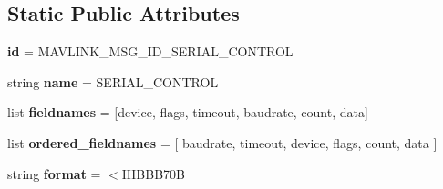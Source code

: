 \subsection*{Static Public Attributes}
\begin{DoxyCompactItemize}
\item 
\mbox{\label{classpymavlink_1_1dialects_1_1v10_1_1MAVLink__serial__control__message_aa2408844aac2a3b64120b519a9031504}} 
{\bfseries id} = M\+A\+V\+L\+I\+N\+K\+\_\+\+M\+S\+G\+\_\+\+I\+D\+\_\+\+S\+E\+R\+I\+A\+L\+\_\+\+C\+O\+N\+T\+R\+OL
\item 
\mbox{\label{classpymavlink_1_1dialects_1_1v10_1_1MAVLink__serial__control__message_ae221a8be8c837e2b15048c8d3442da6c}} 
string {\bfseries name} = \textquotesingle{}S\+E\+R\+I\+A\+L\+\_\+\+C\+O\+N\+T\+R\+OL\textquotesingle{}
\item 
\mbox{\label{classpymavlink_1_1dialects_1_1v10_1_1MAVLink__serial__control__message_a2f12e1de082185361d64c11f4c0a5c3f}} 
list {\bfseries fieldnames} = \mbox{[}\textquotesingle{}device\textquotesingle{}, \textquotesingle{}flags\textquotesingle{}, \textquotesingle{}timeout\textquotesingle{}, \textquotesingle{}baudrate\textquotesingle{}, \textquotesingle{}count\textquotesingle{}, \textquotesingle{}data\textquotesingle{}\mbox{]}
\item 
\mbox{\label{classpymavlink_1_1dialects_1_1v10_1_1MAVLink__serial__control__message_a2a21deee6bf7cb3661b1e84525727d6c}} 
list {\bfseries ordered\+\_\+fieldnames} = \mbox{[} \textquotesingle{}baudrate\textquotesingle{}, \textquotesingle{}timeout\textquotesingle{}, \textquotesingle{}device\textquotesingle{}, \textquotesingle{}flags\textquotesingle{}, \textquotesingle{}count\textquotesingle{}, \textquotesingle{}data\textquotesingle{} \mbox{]}
\item 
\mbox{\label{classpymavlink_1_1dialects_1_1v10_1_1MAVLink__serial__control__message_a6965750e6cb09d98afdf5f6b61031047}} 
string {\bfseries format} = \textquotesingle{}$<$I\+H\+B\+B\+B70B\textquotesingle{}

\end{DoxyCompactItemize}
